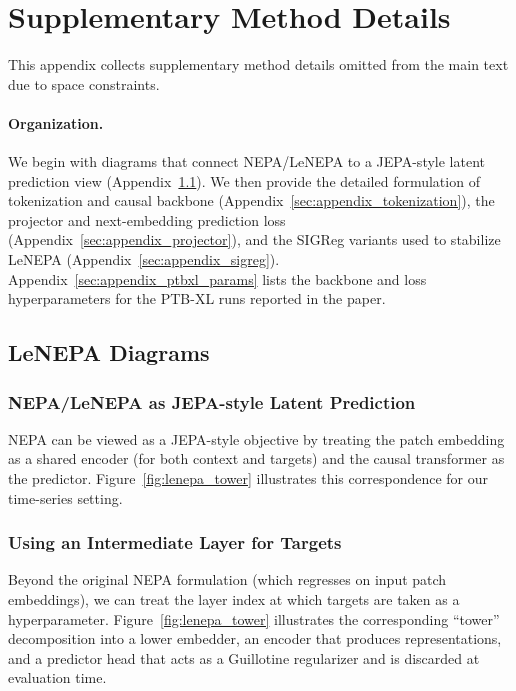\appendix
\section{Supplementary Method Details}
\label{sec:appendix_method}

This appendix collects supplementary method details omitted from the main text due to space constraints.

\paragraph{Organization.}
We begin with diagrams that connect NEPA/LeNEPA to a JEPA-style latent prediction view (Appendix~\ref{sec:appendix_diagrams}).
We then provide the detailed formulation of tokenization and causal backbone (Appendix~\ref{sec:appendix_tokenization}), the projector and next-embedding prediction loss (Appendix~\ref{sec:appendix_projector}), and the SIGReg variants used to stabilize LeNEPA (Appendix~\ref{sec:appendix_sigreg}).
Appendix~\ref{sec:appendix_ptbxl_params} lists the backbone and loss hyperparameters for the PTB-XL runs reported in the paper.

\subsection{LeNEPA Diagrams}
\label{sec:appendix_diagrams}

\subsubsection{NEPA/LeNEPA as JEPA-style Latent Prediction}

NEPA can be viewed as a JEPA-style objective by treating the patch embedding as a shared encoder (for both context and targets) and the causal transformer as the predictor.
Figure~\ref{fig:lenepa_tower} illustrates this correspondence for our time-series setting.

\subsubsection{Using an Intermediate Layer for Targets}

Beyond the original NEPA formulation (which regresses on input patch embeddings), we can treat the layer index at which targets are taken as a hyperparameter.
Figure~\ref{fig:lenepa_tower} illustrates the corresponding ``tower'' decomposition into a lower embedder, an encoder that produces representations, and a predictor head that acts as a Guillotine regularizer and is discarded at evaluation time.

